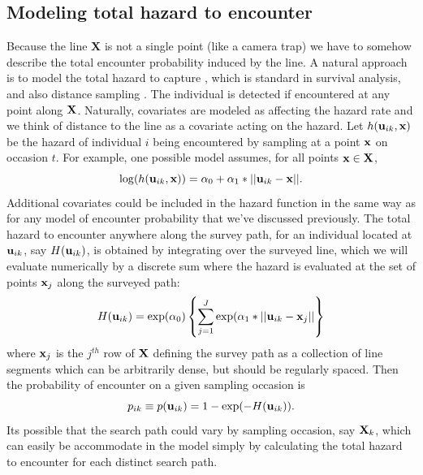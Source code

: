 \subsection{Modeling total hazard to encounter}

Because the line {\bf X} is not a single point (like a camera trap) we
have to somehow describe the total encounter probability induced by
the line. A natural approach is to model the total hazard to capture
\citep{borchers_efford:2008}, which is standard in survival analysis,
and also distance sampling \citep{hayes_buckland:1983,
  skaug_schweder:1999}.  The individual is detected if encountered at
any point along ${\bf X}$. Naturally, covariates are modeled as
affecting the hazard rate and we think of distance to the line as a
covariate acting on the hazard. Let $h({\bf u}_{ik},{\bf x})$ be the
hazard of individual $i$ being encountered by sampling at a point
${\bf x}$ on occasion $t$.  For example, one possible model assumes,
for all points ${\bf x} \in {\bf X}$,
\begin{equation}
\log(h({\bf u}_{ik},{\bf x})) = \alpha_{0} + \alpha_{1}*||{\bf u}_{ik}-{\bf x}||.
\label{eq.hazard}
\end{equation}
Additional covariates could be included in the hazard function in the
same way as for any model of encounter probability that we've
discussed previously.  The total hazard to encounter anywhere along
the survey path, for an individual located at ${\bf u}_{ik}$, say
$H({\bf u}_{ik})$, is obtained by integrating over the surveyed line,
which we will evaluate numerically by a discrete sum where the hazard
is evaluated at the set of points ${\bf x}_{j}$ along the surveyed
path:
\begin{equation}
H({\bf u}_{ik}) =  \exp(\alpha_{0}) \left\{ \sum_{j=1}^{J}  \exp(\alpha_{1}*||{\bf
    u}_{ik} - {\bf x}_{j}|| \right\}
\label{eq.totalhazard}
\end{equation}
where ${\bf x}_{j}$ is the $j^{th}$ row of ${\bf X}$ defining the
survey path as a collection of line segments which can be arbitrarily
dense, but should be regularly spaced.  Then the probability of
encounter on a given sampling occasion  is
\begin{equation}
p_{ik} \equiv p({\bf u}_{ik}) = 1- \exp(-H({\bf u}_{ik})).
\label{search-encounter.eq.encounterprob}
\end{equation}
Its possible that the search path could vary by sampling occasion, say
${\bf X}_{k}$, which can easily be accommodate in the model simply by
calculating the total hazard to encounter for each distinct search
path.

